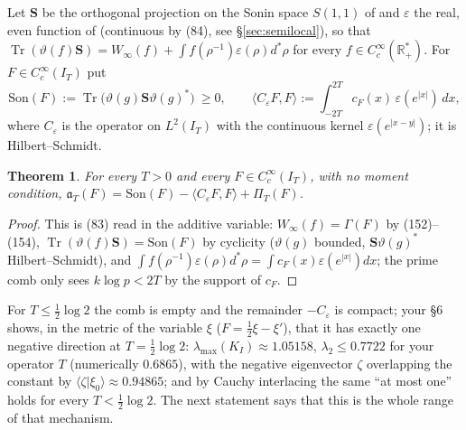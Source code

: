 \documentclass[11pt]{amsart}
\newtheorem{theorem}{Theorem}[section]
\theoremstyle{definition}
\theoremstyle{remark}
\newcommand{\R}{\mathbb R}
\newcommand{\Tr}{\operatorname{Tr}}
\newcommand{\IT}{I_T}
\newcommand{\cF}{c_F}
\newcommand{\PiT}{\Pi_T}
\newcommand{\Son}{\mathrm{Son}}
\begin{document}
Let $\mathbf S$ be the orthogonal projection on the Sonin space $S(1,1)$ of \cite[Def.~4.4]{CC2021} and
$\varepsilon$ the real, even function of \cite[Thm.~4.7, (83)--(84)]{CC2021} (continuous by (84), see \S\ref{sec:semilocal}), so that
$\Tr(\vartheta(f)\mathbf S)=W_\infty(f)+\int f(\rho^{-1})\varepsilon(\rho)d^*\rho$ for every
$f\in C_c^\infty(\R_+^*)$. For $F\in C_c^\infty(\IT)$ put
\[
\Son(F):=\Tr\big(\vartheta(g)\mathbf S\vartheta(g)^*\big)\ \ge0,\qquad
\langle C_\varepsilon F,F\rangle:=\int_{-2T}^{2T}\cF(x)\,\varepsilon(e^{|x|})\,dx ,
\]
where $C_\varepsilon$ is the operator on $L^2(\IT)$ with the continuous kernel $\varepsilon(e^{|x-y|})$; it is
Hilbert--Schmidt.

\begin{theorem}\label{thm:split}
For every $T>0$ and every $F\in C_c^\infty(\IT)$, with no moment condition,
$\mathfrak a_T(F)=\Son(F)-\langle C_\varepsilon F,F\rangle+\PiT(F)$.
\end{theorem}
\begin{proof}
This is (83) read in the additive variable: $W_\infty(f)=\Gamma(F)$ by (152)--(154), $\Tr(\vartheta(f)\mathbf S)=\Son(F)$ by
cyclicity ($\vartheta(g)$ bounded, $\mathbf S\vartheta(g)^*$ Hilbert--Schmidt), and
$\int f(\rho^{-1})\varepsilon(\rho)d^*\rho=\int\cF(x)\varepsilon(e^{|x|})dx$; the prime comb only sees $k\log p<2T$ by the
support of $\cF$.
\end{proof}

For $T\le\frac12\log2$ the comb is empty and the remainder $-C_\varepsilon$ is compact; your \S6 shows, in the
metric of the variable $\xi$ ($F=\frac12\xi-\xi'$), that it has exactly one negative direction at $T=\frac12\log2$:
$\lambda_{\max}(K_I)\approx1.05158$, $\lambda_2\le0.7722$ for your operator $T$ (numerically $0.6865$), with the negative eigenvector $\zeta$ overlapping
the constant by $\langle\zeta|\xi_0\rangle\approx0.94865$; and by Cauchy interlacing the same ``at most one''
holds for every $T<\frac12\log2$. The next statement says that this is the whole range of that mechanism.
\end{document}
